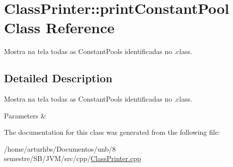 \hypertarget{classClassPrinter_1_1printConstantPool}{}\section{Class\+Printer\+:\+:print\+Constant\+Pool Class Reference}
\label{classClassPrinter_1_1printConstantPool}


Mostra na tela todas as Constant\+Pools identificadas no .class.  




\subsection{Detailed Description}
Mostra na tela todas as Constant\+Pools identificadas no .class. 


\begin{DoxyParams}{Parameters}
{\em } & \\
\hline
\end{DoxyParams}


The documentation for this class was generated from the following file\+:\begin{DoxyCompactItemize}
\item 
/home/arturhbs/\+Documentos/unb/8 semestre/\+S\+B/\+J\+V\+M/src/cpp/\hyperlink{ClassPrinter_8cpp}{Class\+Printer.\+cpp}\end{DoxyCompactItemize}
